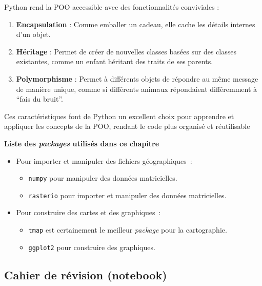\documentclass[11pt]{article}
\providecommand{\tightlist}{%
      \setlength{\itemsep}{0pt}\setlength{\parskip}{0pt}}
\begin{document}
Python rend la POO accessible avec des fonctionnalités conviviales :

\begin{enumerate}
\def\labelenumi{\arabic{enumi}.}
\item
  \textbf{Encapsulation} : Comme emballer un cadeau, elle cache les
  détails internes d'un objet.
\item
  \textbf{Héritage} : Permet de créer de nouvelles classes basées sur
  des classes existantes, comme un enfant héritant des traits de ses
  parents.
\item
  \textbf{Polymorphisme} : Permet à différents objets de répondre au
  même message de manière unique, comme si différents animaux
  répondaient différemment à ``fais du bruit''.
\end{enumerate}

Ces caractéristiques font de Python un excellent choix pour apprendre et
appliquer les concepts de la POO, rendant le code plus organisé et
réutilisable

\textbf{Liste des \emph{packages} utilisés dans ce chapitre}

\begin{itemize}
\tightlist
\item
  Pour importer et manipuler des fichiers géographiques~:

  \begin{itemize}
  \tightlist
  \item
    \texttt{numpy} pour manipuler des données matricielles.
  \item
    \texttt{rasterio} pour importer et manipuler des données
    matricielles.
  \end{itemize}
\item
  Pour construire des cartes et des graphiques~:

  \begin{itemize}
  \tightlist
  \item
    \texttt{tmap} est certainement le meilleur \emph{package} pour la
    cartographie.
  \item
    \texttt{ggplot2} pour construire des graphiques.
  \end{itemize}
\end{itemize}

\hypertarget{sec-016}{%
\subsection{Cahier de révision (notebook)}\label{sec-016}}


    
    
    
\end{document}

